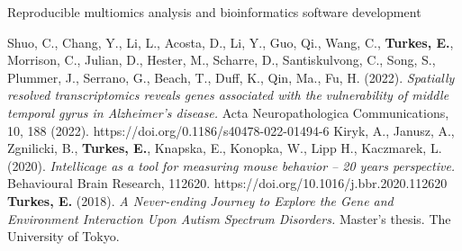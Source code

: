 %
%
%

\vspace*{-0.2cm}

\begin{cvskills}

    {Reproducible multiomics analysis and bioinformatics software development
    \vspace*{-0.1cm}}

    {Shuo, C., Chang, Y., Li, L., Acosta, D., Li, Y., Guo, Qi., Wang, C.,
        \textbf{Turkes, E.}, Morrison, C., Julian, D.,
        \vspace*{-0.1cm}}
    \cvskill{}
    {\hspace*{20pt}Hester, M., Scharre, D., Santiskulvong, C., Song, S., Plummer, J.,
        Serrano, G., Beach, T., Duff, K.,
        \vspace*{-0.1cm}}
    \cvskill{}
    {\hspace*{20pt}Qin, Ma., Fu, H. (2022). \textit{Spatially resolved transcriptomics
        reveals genes associated with the}
        \vspace*{-0.1cm}}
    \cvskill{}
    {\hspace*{20pt}\textit{vulnerability of middle temporal gyrus in Alzheimer’s
        disease.} Acta Neuropathologica
        \vspace*{-0.1cm}}
    \cvskill{}
    {\hspace*{20pt}Communications, 10, 188 (2022).
        https://doi.org/0.1186/s40478-022-01494-6
        \vspace*{-0.1cm}}
    \cvskill{}
    {Kiryk, A., Janusz, A., Zgnilicki, B., \textbf{Turkes, E.}, Knapska, E.,
        Konopka, W., Lipp H., Kaczmarek, L. (2020).
        \vspace*{-0.1cm}}
    \cvskill{}
    {\hspace*{20pt}\textit{Intellicage as a tool for measuring mouse behavior – 20
        years perspective.} Behavioural Brain
        \vspace*{-0.1cm}}
    \cvskill{}
    {\hspace*{20pt}Research, 112620. https://doi.org/10.1016/j.bbr.2020.112620}
    \vspace*{-0.1cm}
    \cvskill{}
    {\textbf{Turkes, E.} (2018). \textit{A Never-ending Journey to Explore the
        Gene and Environment Interaction Upon Autism}
        \vspace*{-0.1cm}}
    \cvskill{}
    {\hspace*{20pt}\textit{Spectrum Disorders.} Master's thesis. The University of
        Tokyo.}

\vspace*{-1cm}
\end{cvskills}
